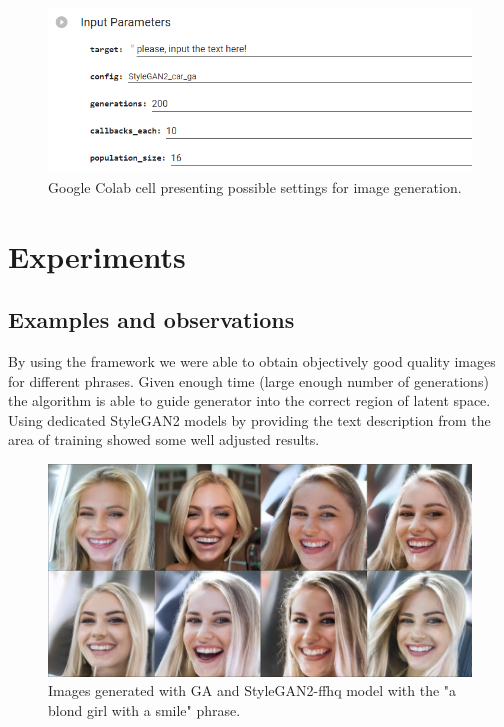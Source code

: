 \documentclass[12pt,a4paper,openany]{book}
\begin{document}
\begin{figure}[H]
    \centering
    \includegraphics[scale=0.8]{figs/collab.png}
    \caption{Google Colab cell presenting possible settings for image generation.}\label{Fig:collab}
\end{figure}


\chapter{Experiments}

\section{Examples and observations}

\noindent By using the framework we were able to obtain objectively good quality images for different phrases. Given enough time (large enough number of generations) the algorithm is able to guide generator into the correct region of latent space. Using dedicated StyleGAN2 models by providing the text description from the area of training showed some well adjusted results.

\begin{figure}[H]
    \centering
    \includegraphics[scale=0.6]{figs/blondgirl.png}
    \caption{Images generated with GA and StyleGAN2-ffhq model with the "a blond girl with a smile" phrase.}\label{Fig:blondgirl}
\end{figure}
\end{document}
